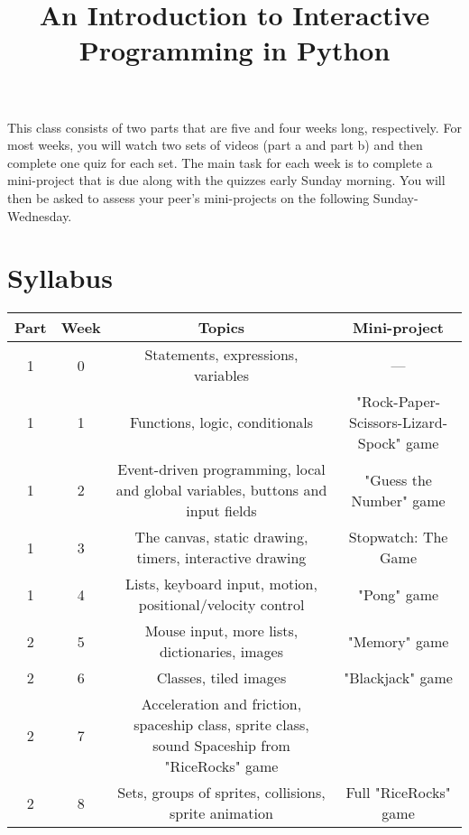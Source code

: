 \documentclass[a4paper,10pt]{article}
\title{An Introduction to Interactive Programming in Python}
\date{}
\begin{document}
\begin{CJK}{UTF8}{gkai}

\maketitle


\par This class consists of two parts that are five and four weeks long, respectively. For most weeks, you will watch two sets of videos (part a and part b) and then complete one quiz for each set. The main task for each week is to complete a mini-project that is due along with the quizzes early Sunday morning. You will then be asked to assess your peer's mini-projects on the following Sunday-Wednesday.

\section*{Syllabus}

\begin{landscape}

\begin{tabular}{cccc}

\hline
Part& Week& Topics& Mini-project\\
\hline

1&	0&	Statements, expressions, variables&	---\\
1&	1&	Functions, logic, conditionals&	"Rock-Paper-Scissors-Lizard-Spock" game\\
1&	2&	Event-driven programming, local and global variables, buttons and input fields&	"Guess the Number" game\\
1&	3&	The canvas, static drawing, timers, interactive drawing&	Stopwatch: The Game\\
1&	4&	Lists, keyboard input, motion, positional/velocity control&	"Pong" game\\
2&	5&	Mouse input, more lists, dictionaries, images&	"Memory" game\\
2&	6&	Classes, tiled images&	"Blackjack" game\\
2&	7&	Acceleration and friction, spaceship class, sprite class, sound	Spaceship from "RiceRocks" game\\
2&	8&	Sets, groups of sprites, collisions, sprite animation&	Full "RiceRocks" game\\

\hline

\end{tabular}

\end{landscape}
\end{CJK}
\end{document}
